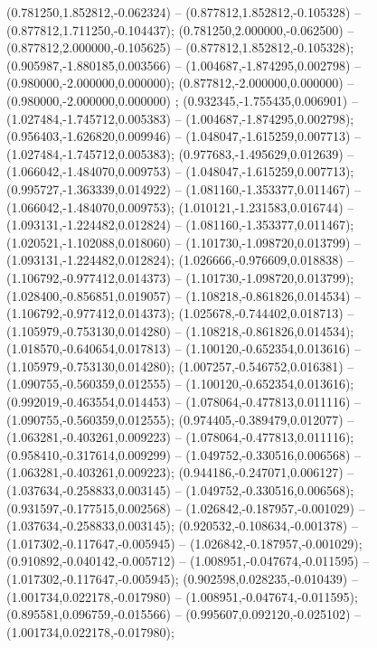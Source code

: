  (0.781250,1.852812,-0.062324) -- (0.877812,1.852812,-0.105328) -- (0.877812,1.711250,-0.104437);
 (0.781250,2.000000,-0.062500) -- (0.877812,2.000000,-0.105625) -- (0.877812,1.852812,-0.105328);
 (0.905987,-1.880185,0.003566) -- (1.004687,-1.874295,0.002798) -- (0.980000,-2.000000,0.000000);
 (0.877812,-2.000000,0.000000) -- (0.980000,-2.000000,0.000000) ;
 (0.932345,-1.755435,0.006901) -- (1.027484,-1.745712,0.005383) -- (1.004687,-1.874295,0.002798);
 (0.956403,-1.626820,0.009946) -- (1.048047,-1.615259,0.007713) -- (1.027484,-1.745712,0.005383);
 (0.977683,-1.495629,0.012639) -- (1.066042,-1.484070,0.009753) -- (1.048047,-1.615259,0.007713);
 (0.995727,-1.363339,0.014922) -- (1.081160,-1.353377,0.011467) -- (1.066042,-1.484070,0.009753);
 (1.010121,-1.231583,0.016744) -- (1.093131,-1.224482,0.012824) -- (1.081160,-1.353377,0.011467);
 (1.020521,-1.102088,0.018060) -- (1.101730,-1.098720,0.013799) -- (1.093131,-1.224482,0.012824);
 (1.026666,-0.976609,0.018838) -- (1.106792,-0.977412,0.014373) -- (1.101730,-1.098720,0.013799);
 (1.028400,-0.856851,0.019057) -- (1.108218,-0.861826,0.014534) -- (1.106792,-0.977412,0.014373);
 (1.025678,-0.744402,0.018713) -- (1.105979,-0.753130,0.014280) -- (1.108218,-0.861826,0.014534);
 (1.018570,-0.640654,0.017813) -- (1.100120,-0.652354,0.013616) -- (1.105979,-0.753130,0.014280);
 (1.007257,-0.546752,0.016381) -- (1.090755,-0.560359,0.012555) -- (1.100120,-0.652354,0.013616);
 (0.992019,-0.463554,0.014453) -- (1.078064,-0.477813,0.011116) -- (1.090755,-0.560359,0.012555);
 (0.974405,-0.389479,0.012077) -- (1.063281,-0.403261,0.009223) -- (1.078064,-0.477813,0.011116);
 (0.958410,-0.317614,0.009299) -- (1.049752,-0.330516,0.006568) -- (1.063281,-0.403261,0.009223);
 (0.944186,-0.247071,0.006127) -- (1.037634,-0.258833,0.003145) -- (1.049752,-0.330516,0.006568);
 (0.931597,-0.177515,0.002568) -- (1.026842,-0.187957,-0.001029) -- (1.037634,-0.258833,0.003145);
 (0.920532,-0.108634,-0.001378) -- (1.017302,-0.117647,-0.005945) -- (1.026842,-0.187957,-0.001029);
 (0.910892,-0.040142,-0.005712) -- (1.008951,-0.047674,-0.011595) -- (1.017302,-0.117647,-0.005945);
 (0.902598,0.028235,-0.010439) -- (1.001734,0.022178,-0.017980) -- (1.008951,-0.047674,-0.011595);
 (0.895581,0.096759,-0.015566) -- (0.995607,0.092120,-0.025102) -- (1.001734,0.022178,-0.017980);
